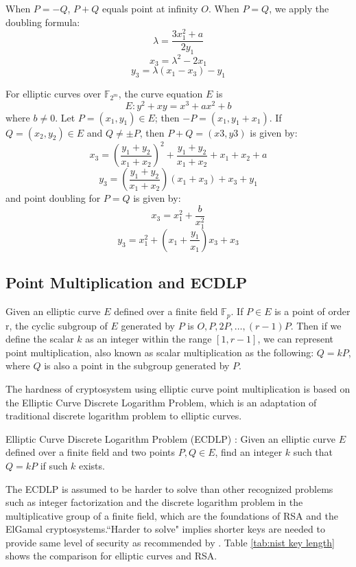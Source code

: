 When $P=-Q$, $P+Q$ equals point at infinity $O$. When $P=Q$, we apply the doubling formula:
$$\lambda = \frac{3x_1^2+a}{2y_1}$$
$$x_3=\lambda^2-2x_1$$
$$y_3=\lambda(x_1-x_3)-y_1$$

For elliptic curves over $\mathbb{F}_{2^m}$, the curve equation $E$ is $$E: y^2+xy=x^3+ax^2+b$$ where $b \neq 0$. Let $P=(x_1,y_1) \in E$; then $-P = (x_1,y_1+x_1)$. If $Q=(x_2,y_2) \in E$ and $Q \neq \pm P$, then $P+Q=(x3,y3)$ is given by:
$$x_3=(\frac{y_1+y_2}{x_1+x_2})^2+\frac{y_1+y_2}{x_1+x_2}+x_1+x_2+a$$
$$y_3=(\frac{y_1+y_2}{x_1+x_2})(x_1+x_3)+x_3+y_1$$
and point doubling for $P=Q$ is given by:
$$x_3=x_1^2+\frac{b}{x_1^2}$$
$$y_3=x_1^2+(x_1+\frac{y_1}{x_1})x_3+x_3$$


\subsection{Point Multiplication and ECDLP}
Given an elliptic curve $E$ defined over a finite field $\mathbb{F}_p$. If $P \in E$ is a point of order r, the cyclic subgroup of $E$ generated by $P$ is ${O,P,2P,\ldots,(r-1)P}$. Then if we define the scalar $k$ as an integer within the range $[1,r-1]$, we can represent point multiplication, also known as scalar multiplication as the following: $Q=kP$, where $Q$ is also a point in the subgroup generated by $P$. 

The hardness of cryptosystem using elliptic curve point multiplication is based on the Elliptic Curve Discrete Logarithm Problem, which is an adaptation of traditional discrete logarithm problem to elliptic curves.

\begin{mydef}
Elliptic Curve Discrete Logarithm Problem (ECDLP) : Given an elliptic curve $E$ defined over a finite field and two points $P,Q \in E$, find an integer $k$ such that $Q = kP$ if such $k$ exists.
\end{mydef}

The ECDLP is assumed to be harder to solve than other recognized problems such as integer factorization and the discrete logarithm problem in the multiplicative group of a finite field, which are the foundations of RSA \cite{rivest1978method} and the ElGamal \cite{elgamal1985public} cryptosystems.``Harder to solve" implies shorter keys are needed to provide same level of security as recommended by \cite{barker2006recommendation}. Table \ref{tab:nist key length} shows the comparison for elliptic curves and RSA.  

